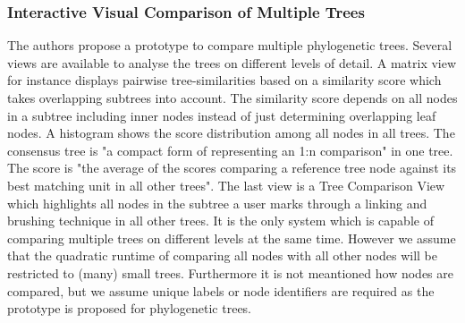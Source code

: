 \subsubsection{Interactive Visual Comparison of Multiple Trees\cite{bremm2011interactive}} The authors propose a prototype to compare multiple phylogenetic trees. Several views are available to analyse the trees on different levels of detail. A matrix view for instance displays pairwise tree-similarities based on a similarity score which takes overlapping subtrees into account. The similarity score depends on all nodes in a subtree including inner nodes instead of just determining overlapping leaf nodes. A histogram shows the score distribution among all nodes in all trees. The consensus tree is "a compact form of representing an 1:n comparison" in one tree. The score is "the average of the scores comparing a reference tree node against its best matching unit in all other trees". The last view is a Tree Comparison View which highlights all nodes in the subtree a user marks through a linking and brushing technique in all other trees. It is the only system which is capable of comparing multiple trees on different levels at the same time. However we assume that the quadratic runtime of comparing all nodes with all other nodes will be restricted to (many) small trees. Furthermore it is not meantioned how nodes are compared, but we assume unique labels or node identifiers are required as the prototype is proposed for phylogenetic trees. 

